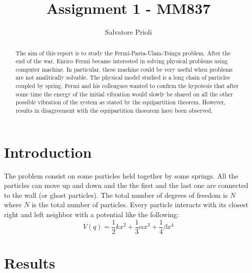 \documentclass[12pt,a4paper,twocolumn]{article}
\author{Salvatore Prioli}
\title{\textbf{Assignment 1 - MM837}}
\begin{document}
\maketitle
\begin{abstract}
The aim of this report is to study the Fermi-Pasta-Ulam-Tsingu problem. 
After the end of the war, Enrico Fermi became interested in solving physical problems using computer machine.
In particular, these machine could be very useful when problems are not analitically solvable. 
The physical model studied is a long chain of particles coupled by spring. 
Fermi and his colleagues wanted to confirm the hypotesis that after some time the energy of the initial vibration would slowly be shared on all the other possible vibration of the system as stated by the equipartition theorem. 
However, results in disagreement with the equipartition thoeorem have been observed.
\end{abstract}
\section{Introduction}
The problem consist on some particles held together by some springs. All the particles can move up and down and the the first and the last one are connected to the wall (or ghost particles). The total number of degrees of freedom is $N$ where $N$ is the total number of particles. Every particle interacts with its closest right and left neighbor with a potential like the following:
\begin{equation}
	V(q)=\frac{1}{2}kx^2+\frac{1}{3}\alpha x^3 +\frac{1}{4}\beta x^4
\end{equation}
\section{Results}
\end{document}
